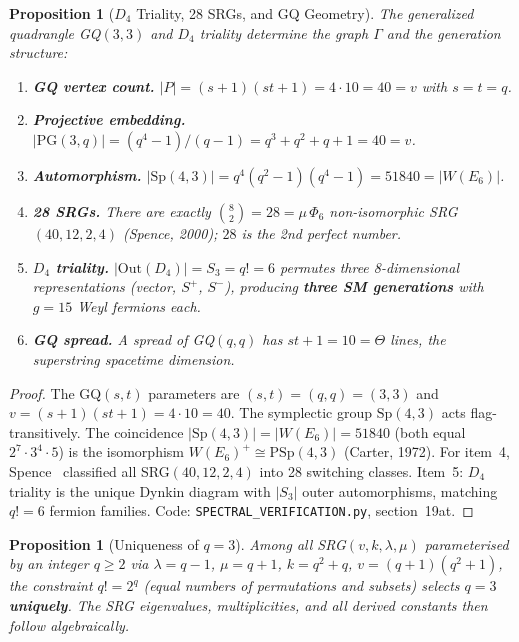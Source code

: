 \documentclass[12pt,a4paper]{article}
\newtheorem{proposition}[theorem]{Proposition}
\begin{document}
\begin{proposition}[$D_4$ Triality, 28 SRGs, and GQ Geometry]
\label{prop:triality}
The generalized quadrangle GQ$(3,3)$ and $D_4$ triality
determine the graph $\Gamma$ and the generation structure:
\begin{enumerate}
\item \textbf{GQ vertex count.}
  $|P| = (s{+}1)(st{+}1) = 4\cdot 10 = 40 = v$ with $s=t=q$.
\item \textbf{Projective embedding.}
  $|\mathrm{PG}(3,q)| = (q^4{-}1)/(q{-}1) = q^3{+}q^2{+}q{+}1 = 40 = v$.
\item \textbf{Automorphism.}
  $|\mathrm{Sp}(4,3)| = q^4(q^2{-}1)(q^4{-}1) = 51840 = |W(E_6)|$.
\item \textbf{28 SRGs.}
  There are exactly $\binom{8}{2} = 28 = \mu\,\Phi_6$
  non-isomorphic SRG$(40,12,2,4)$ (Spence, 2000);
  $28$ is the 2nd perfect number.
\item \textbf{$D_4$ triality.}
  $|\mathrm{Out}(D_4)| = S_3 = q! = 6$ permutes
  three 8-dimensional representations (vector, $S^+$, $S^-$),
  producing \textbf{three SM generations} with $g=15$ Weyl fermions each.
\item \textbf{GQ spread.}
  A spread of GQ$(q,q)$ has $st+1 = 10 = \Theta$ lines,
  the superstring spacetime dimension.
\end{enumerate}
\end{proposition}

\begin{proof}
The GQ$(s,t)$ parameters are $(s,t)=(q,q)=(3,3)$ and
$v = (s{+}1)(st{+}1) = 4\cdot 10 = 40$.
The symplectic group $\mathrm{Sp}(4,3)$ acts flag-transitively.
The coincidence $|\mathrm{Sp}(4,3)| = |W(E_6)| = 51840$
(both equal $2^7 \cdot 3^4 \cdot 5$) is the isomorphism
$W(E_6)^+ \cong \mathrm{PSp}(4,3)$ (Carter, 1972).
For item~4, Spence~\cite{spence2000} classified all
SRG$(40,12,2,4)$ into 28 switching classes.
Item~5: $D_4$ triality is the unique Dynkin diagram with
$|S_3|$ outer automorphisms, matching $q!=6$ fermion families.
Code: \texttt{SPECTRAL\_VERIFICATION.py}, section~19at.
\end{proof}


\begin{proposition}[Uniqueness of $q = 3$]\label{prop:uniqueness}
Among all SRG$(v,k,\lambda,\mu)$ parameterised by an integer $q \ge 2$
via $\lambda = q - 1$, $\mu = q + 1$, $k = q^2 + q$,
$v = (q+1)(q^2+1)$, the constraint $q! = 2^q$ (equal numbers of
permutations and subsets) selects $q = 3$ \textbf{uniquely}.
The SRG eigenvalues, multiplicities, and all derived constants
then follow algebraically.
\end{proposition}
\end{document}

